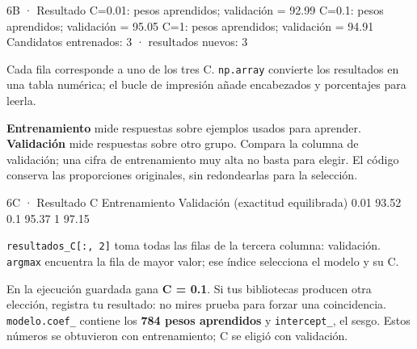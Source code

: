 \begin{Salida}{6B · Resultado}
C=0.01: pesos aprendidos; validación = 92.99%
C=0.1: pesos aprendidos; validación = 95.05%
C=1: pesos aprendidos; validación = 94.91%
Candidatos entrenados: 3 · resultados nuevos: 3
\end{Salida}

\label{paso-6c}

Cada fila corresponde a uno de los tres C. \texttt{\small np.\allowbreak{}array} convierte los resultados en una tabla numérica; el bucle de impresión añade encabezados y porcentajes para leerla.

\textbf{Entrenamiento} mide respuestas sobre ejemplos usados para aprender. \textbf{Validación} mide respuestas sobre otro grupo. Compara la columna de validación; una cifra de entrenamiento muy alta no basta para elegir. El código conserva las proporciones originales, sin redondearlas para la selección.



\begin{Salida}{6C · Resultado}
C       Entrenamiento    Validación   (exactitud equilibrada)
0.01          93.52%
0.1           95.37%
1             97.15%
\end{Salida}

\label{paso-6d}

\texttt{\small resultados\_\allowbreak{}C[\allowbreak{}:\allowbreak{},\allowbreak{} 2]\allowbreak{}} toma todas las filas de la tercera columna: validación. \texttt{\small argmax} encuentra la fila de mayor valor; ese índice selecciona el modelo y su C.

En la ejecución guardada gana \textbf{C = 0.1}. Si tus bibliotecas producen otra elección, registra tu resultado: no mires prueba para forzar una coincidencia. \texttt{\small modelo.\allowbreak{}coef\_\allowbreak{}} contiene los \textbf{784 pesos aprendidos} y \texttt{\small intercept\_\allowbreak{}}, el sesgo. Estos números se obtuvieron con entrenamiento; C se eligió con validación.


